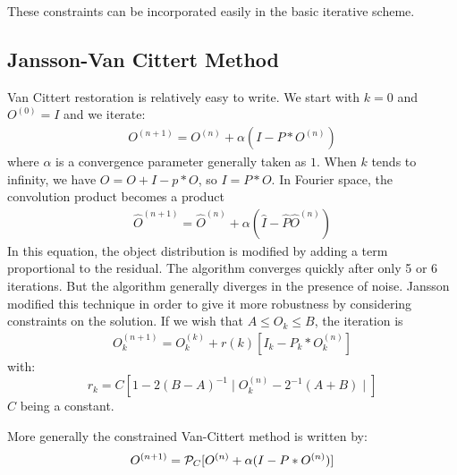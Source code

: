 \documentclass[11pt,a4paper]{article}
\begin{document}
These constraints can be incorporated easily in the basic iterative scheme.

\subsection{Jansson-Van Cittert Method}
Van Cittert \cite{rest:vancittert31}  restoration is relatively easy to write.
We start with $k=0$ and $O^{(0)} = I$ and we iterate:
\begin{eqnarray}
O^{(n+1)}  = O^{(n)}  + \alpha(I - P * O^{(n)})
\label{vanvan}
\end{eqnarray}
where $\alpha$ is a convergence parameter generally taken as $1$.
When $k$ tends to infinity, we have $O = O + I - p * O$, so $I = P * O$. In
Fourier space, the convolution product becomes a product 
\begin{eqnarray}
\hat{O}^{(n+1)} = \hat{O}^{(n)}  + \alpha(\hat{I} - \hat{P}  \hat{O}^{(n)})
\end{eqnarray}
In this equation, the object distribution is modified by adding a term
proportional to the residual. The algorithm converges quickly after only
5 or 6 iterations. But the algorithm generally diverges in the
presence of noise. Jansson \cite{rest:jansson68} 
modified this technique in order to give it
more robustness by considering constraints on the solution. If we wish
that $ A \leq O_k \leq B$, the iteration is
\begin{eqnarray}
O^{(n+1)}_k = O^{(k)}_k + r(k)[I_k - P_k * O^{(n)}_k]
\end{eqnarray}
with:
\[r_k = C[1 - 2(B-A)^{-1}\mid O^{(n)}_k - 2^{-1}(A+B)\mid]\]
$C$ being a constant.

More generally the constrained Van-Cittert method is written by:
\begin{eqnarray}
O^{(n+1)}  = {\cal P}_C [ O^{(n)}  + \alpha(I - P *  O^{(n)}) ]
\end{eqnarray}
\end{document}
